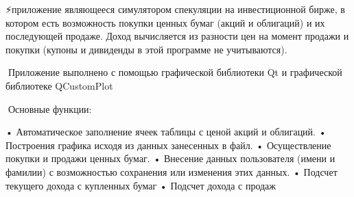 ⚡приложение являющееся симулятором спекуляции на инвестиционной бирже, в котором есть возможность покупки ценных бумаг (акций и облигаций) и их последующей продаже. Доход вычисляется из разности цен на момент продажи и покупки (купоны и дивиденды в этой программе не учитываются).

📄Приложение выполнено с помощью графической библиотеки Qt и графической библиотеке QCustom\+Plot

🔨Основные функции\+: \begin{DoxyVerb}• Автоматическое заполнение ячеек таблицы с ценой акций и облигаций.
• Построения графика исходя из данных занесенных в файл.
• Осуществление покупки и продажи ценных бумаг.
• Внесение данных пользователя (имени и фамилии) с возможностью
сохранения или изменения этих данных.
• Подсчет текущего дохода с купленных бумаг
• Подсчет дохода с продаж
\end{DoxyVerb}
 